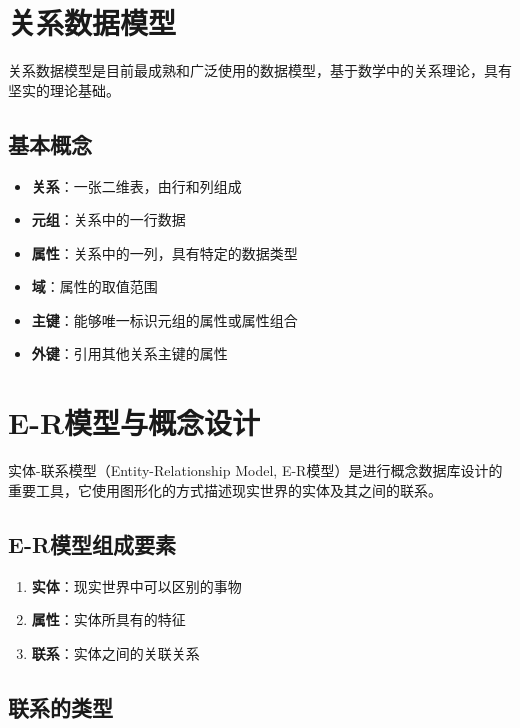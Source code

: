 \section{关系数据模型}

关系数据模型是目前最成熟和广泛使用的数据模型，基于数学中的关系理论，具有坚实的理论基础。

\subsection{基本概念}

\begin{itemize}
    \item \textbf{关系}：一张二维表，由行和列组成
    \item \textbf{元组}：关系中的一行数据
    \item \textbf{属性}：关系中的一列，具有特定的数据类型
    \item \textbf{域}：属性的取值范围
    \item \textbf{主键}：能够唯一标识元组的属性或属性组合
    \item \textbf{外键}：引用其他关系主键的属性
\end{itemize}


\section{E-R模型与概念设计}

实体-联系模型（Entity-Relationship Model, E-R模型）是进行概念数据库设计的重要工具，它使用图形化的方式描述现实世界的实体及其之间的联系。

\subsection{E-R模型组成要素}

\begin{enumerate}
    \item \textbf{实体}：现实世界中可以区别的事物
    \item \textbf{属性}：实体所具有的特征
    \item \textbf{联系}：实体之间的关联关系
\end{enumerate}

\subsection{联系的类型}

